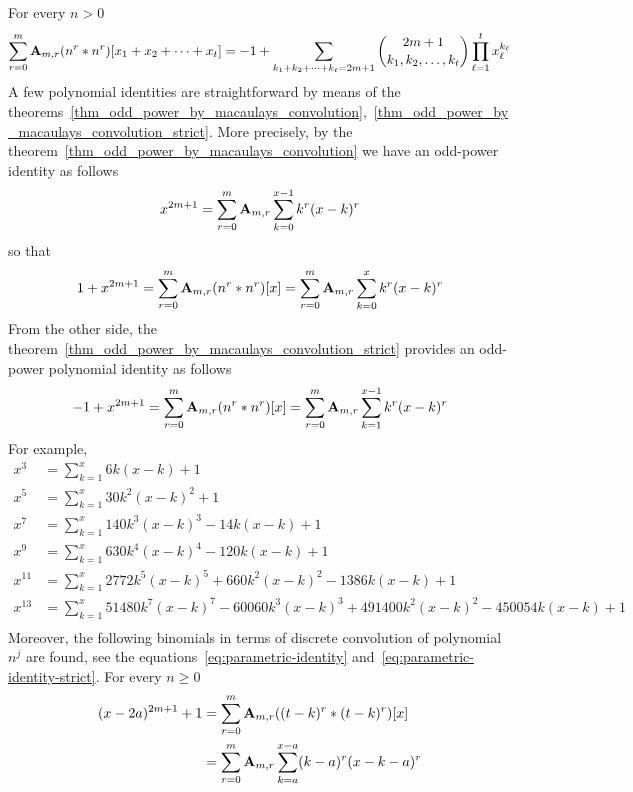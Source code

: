 For every $n>0$
\begin{align*}
    \sum_{r=0}^{m} \coeffA{m}{r} \convPower{n}{r}{\multifoldSum{t}} =
    -1 + \sum_{\multifoldSum[k]{t}=2m+1} \binom{2m+1}{k_1, k_2,\ldots, k_t} \prod_{\ell=1}^{t} x_\ell^{k_\ell}
\end{align*}
A few polynomial identities are straightforward by means of
the theorems~\eqref{thm_odd_power_by_macaulays_convolution},~\eqref{thm_odd_power_by_macaulays_convolution_strict}.
More precisely, by the theorem~\eqref{thm_odd_power_by_macaulays_convolution} we have an odd-power identity as follows
\begin{equation*}
    x^{2m+1} = \sum_{r=0}^{m} \coeffA{m}{r} \sum_{k=0}^{x-1} k^r (x-k)^r
\end{equation*}
so that
\begin{align*}
    1 + x^{2m+1} = \sum_{r=0}^{m} \coeffA{m}{r} \convPower{n}{r}{x}
    = \sum_{r=0}^{m} \coeffA{m}{r} \sum_{k=0}^{x} k^r (x-k)^r
\end{align*}
From the other side, the theorem~\eqref{thm_odd_power_by_macaulays_convolution_strict} provides an odd-power
polynomial identity as follows
\begin{equation*}
    -1 + x^{2m+1} = \sum_{r=0}^{m} \coeffA{m}{r} \convPower{n}{r}{x}
    = \sum_{r=0}^{m} \coeffA{m}{r} \sum_{k=1}^{x-1} k^r (x-k)^r
\end{equation*}
For example,
\begin{align*}
    x^3 &= \sum_{k=1}^{x} 6k (x-k) + 1 \\
    x^5 &= \sum_{k=1}^{x} 30k^2 (x-k)^2 + 1 \\
    x^7 &= \sum_{k=1}^{x} 140 k^3 (x-k)^3 - 14k(x-k) + 1 \\
    x^9 &= \sum_{k=1}^{x} 630 k^4(x-k)^4 - 120k(x-k) + 1 \\
    x^{11} &= \sum_{k=1}^{x} 2772 k^5 (x-k)^5 + 660 k^2(x-k)^2 - 1386k(x-k) + 1 \\
    x^{13} &= \sum_{k=1}^{x} 51480 k^7 (x-k)^7 - 60060 k^3 (x-k)^3 + 491400 k^2 (x-k)^{2} - 450054 k (x-k) + 1 \\
\end{align*}
Moreover, the following binomials in terms of discrete convolution of polynomial $n^j$ are found,
see the equations~\eqref{eq:parametric-identity} and~\eqref{eq:parametric-identity-strict}.
For every $n \geq 0$
\begin{equation*}
    \begin{split}
    (x-2a)
        ^{2m+1} + 1 &= \sum_{r=0}^{m} \coeffA{m}{r} ((t-k)^r \ast (t-k)^r)[x] \\
                    &= \sum_{r=0}^{m} \coeffA{m}{r} \sum_{k=a}^{x-a} (k-a)^r (x-k-a)^r
    \end{split}
\end{equation*}
